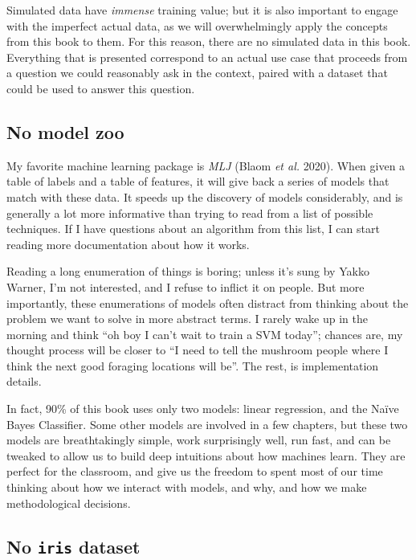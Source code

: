 \documentclass[
  letterpaper,
]{scrbook}
\begin{document}
Simulated data have \emph{immense} training value; but it is also
important to engage with the imperfect actual data, as we will
overwhelmingly apply the concepts from this book to them. For this
reason, there are no simulated data in this book. Everything that is
presented correspond to an actual use case that proceeds from a question
we could reasonably ask in the context, paired with a dataset that could
be used to answer this question.

\subsection{No model zoo}\label{no-model-zoo}

My favorite machine learning package is \emph{MLJ} (Blaom \emph{et al.}
2020). When given a table of labels and a table of features, it will
give back a series of models that match with these data. It speeds up
the discovery of models considerably, and is generally a lot more
informative than trying to read from a list of possible techniques. If I
have questions about an algorithm from this list, I can start reading
more documentation about how it works.

Reading a long enumeration of things is boring; unless it's sung by
Yakko Warner, I'm not interested, and I refuse to inflict it on people.
But more importantly, these enumerations of models often distract from
thinking about the problem we want to solve in more abstract terms. I
rarely wake up in the morning and think ``oh boy I can't wait to train a
SVM today''; chances are, my thought process will be closer to ``I need
to tell the mushroom people where I think the next good foraging
locations will be''. The rest, is implementation details.

In fact, 90\% of this book uses only two models: linear regression, and
the Naïve Bayes Classifier. Some other models are involved in a few
chapters, but these two models are breathtakingly simple, work
surprisingly well, run fast, and can be tweaked to allow us to build
deep intuitions about how machines learn. They are perfect for the
classroom, and give us the freedom to spent most of our time thinking
about how we interact with models, and why, and how we make
methodological decisions.

\subsection{\texorpdfstring{No \texttt{iris}
dataset}{No iris dataset}}\label{no-iris-dataset}
\end{document}
